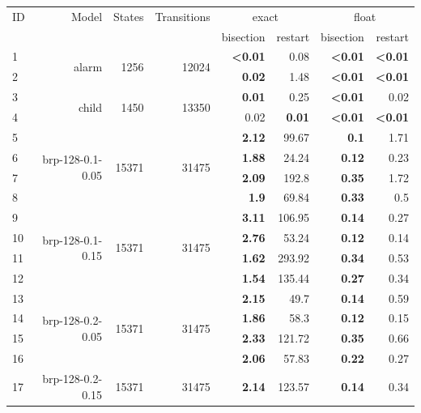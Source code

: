 \begin{longtable}{lrr@{\hskip 12pt}r@{\hskip 12pt}r@{\hskip 12pt}r@{\hskip 12pt}r@{\hskip 12pt}r}
\toprule
ID & Model & States & Transitions & \multicolumn{2}{c}{exact} & \multicolumn{2}{c}{float} \\
\cmidrule(lr){5-6}\cmidrule(lr){7-8}
 & & &  & bisection & restart & bisection & restart \\
\midrule
\endhead
1 & \multirow{2}{*}{alarm} & \multirow{2}{*}{1256} & \multirow{2}{*}{12024} & \textbf{<0.01} & 0.08 & \textbf{<0.01} & \textbf{<0.01} \\
2 &  &  &  & \textbf{0.02} & 1.48 & \textbf{<0.01} & \textbf{<0.01} \\
\cmidrule{5-8}
3 & \multirow{2}{*}{child} & \multirow{2}{*}{1450} & \multirow{2}{*}{13350} & \textbf{0.01} & 0.25 & \textbf{<0.01} & 0.02 \\
4 &  &  &  & 0.02 & \textbf{0.01} & \textbf{<0.01} & \textbf{<0.01} \\
\midrule
5 & \multirow{4}{*}{brp-128-0.1-0.05} & \multirow{4}{*}{15371} & \multirow{4}{*}{31475} & \textbf{2.12} & 99.67 & \textbf{0.1} & 1.71 \\
6 &  &  &  & \textbf{1.88} & 24.24 & \textbf{0.12} & 0.23 \\
7 &  &  &  & \textbf{2.09} & 192.8 & \textbf{0.35} & 1.72 \\
8 &  &  &  & \textbf{1.9} & 69.84 & \textbf{0.33} & 0.5 \\
\cmidrule{5-8}
9 & \multirow{4}{*}{brp-128-0.1-0.15} & \multirow{4}{*}{15371} & \multirow{4}{*}{31475} & \textbf{3.11} & 106.95 & \textbf{0.14} & 0.27 \\
10 &  &  &  & \textbf{2.76} & 53.24 & \textbf{0.12} & 0.14 \\
11 &  &  &  & \textbf{1.62} & 293.92 & \textbf{0.34} & 0.53 \\
12 &  &  &  & \textbf{1.54} & 135.44 & \textbf{0.27} & 0.34 \\
\cmidrule{5-8}
13 & \multirow{4}{*}{brp-128-0.2-0.05} & \multirow{4}{*}{15371} & \multirow{4}{*}{31475} & \textbf{2.15} & 49.7 & \textbf{0.14} & 0.59 \\
14 &  &  &  & \textbf{1.86} & 58.3 & \textbf{0.12} & 0.15 \\
15 &  &  &  & \textbf{2.33} & 121.72 & \textbf{0.35} & 0.66 \\
16 &  &  &  & \textbf{2.06} & 57.83 & \textbf{0.22} & 0.27 \\
\cmidrule{5-8}
17 & \multirow{4}{*}{brp-128-0.2-0.15} & \multirow{4}{*}{15371} & \multirow{4}{*}{31475} & \textbf{2.14} & 123.57 & \textbf{0.14} & 0.34 \\

\end{longtable}
